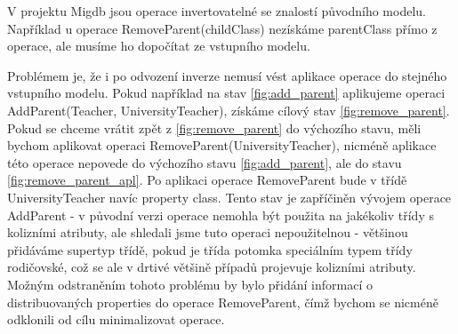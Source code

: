 \documentclass[11pt,twoside,a4paper]{book}
\begin{document}
V projektu Migdb jsou operace invertovatelné se znalostí původního modelu.
Například u operace RemoveParent(childClass) nezískáme parentClass přímo z
operace, ale musíme ho dopočítat ze vstupního modelu.

\label{app_ops:removeParent_example} Problémem je, že i po odvození inverze
nemusí vést aplikace operace do stejného vstupního modelu. Pokud například na
stav \ref{fig:add_parent} aplikujeme operaci AddParent(Teacher,
UniversityTeacher), získáme cílový stav
\ref{fig:remove_parent}. Pokud se chceme vrátit zpět z \ref{fig:remove_parent}
do výchozího stavu, měli bychom aplikovat operaci
RemoveParent(UniversityTeacher), nicméně aplikace této operace nepovede do
výchozího stavu \ref{fig:add_parent}, ale do stavu \ref{fig:remove_parent_apl}.
Po aplikaci operace RemoveParent bude v třídě UniversityTeacher navíc property
class. Tento stav je zapříčiněn vývojem operace AddParent - v původní verzi
operace nemohla být použita na jakékoliv třídy s kolizními atributy, ale
shledali jsme tuto operaci nepoužitelnou - většinou přidáváme supertyp třídě,
pokud je třída potomka speciálním typem třídy rodičovské, což se ale v
drtivé většině případů projevuje kolizními atributy. Možným odstraněním tohoto
problému by bylo přidání informací o distribuovaných properties do operace
RemoveParent, čímž bychom se nicméně odklonili od cílu minimalizovat operace.
\end{document}
